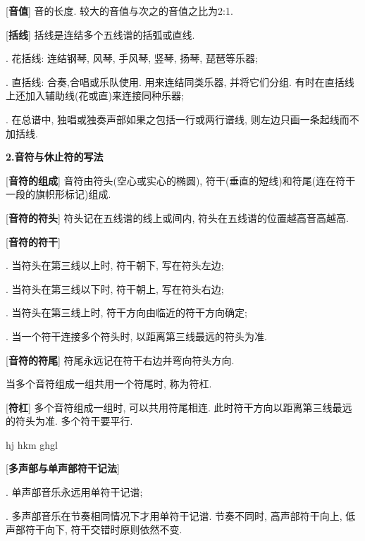 [\textbf{音值}] 音的长度. 较大的音值与次之的音值之比为2:1.\par

[\textbf{括线}] 括线是连结多个五线谱的括弧或直线.\par
{}
\startextract\zendextract
{}. 花括线: 连结钢琴, 风琴, 手风琴, 竖琴, 扬琴, 琵琶等乐器;\par
{}. 直括线: 合奏,合唱或乐队使用. 用来连结同类乐器, 并将它们分组. 有时在直括线上还加入辅助线(花或直)来连接同种乐器;\par
{}. 在总谱中, 独唱或独奏声部如果之包括一行或两行谱线, 则左边只画一条起线而不加括线.\par

\begin{center}
 \textbf{2.音符与休止符的写法}\\
\end{center}

[\textbf{音符的组成}] 音符由符头(空心或实心的椭圆), 符干(垂直的短线)和符尾(连在符干一段的旗帜形标记)组成.\par

[\textbf{音符的符头}] 符头记在五线谱的线上或间内, 符头在五线谱的位置越高音高越高.\par

[\textbf{音符的符干}] \par
{}. 当符头在第三线以上时, 符干朝下, 写在符头左边;\par
{}. 当符头在第三线以下时, 符干朝上, 写在符头右边;\par
{}. 当符头在第三线上时, 符干方向由临近的符干方向确定;\par
{}. 当一个符干连接多个符头时, 以距离第三线最远的符头为准.\par

[\textbf{音符的符尾}] 符尾永远记在符干右边并弯向符头方向.\par
\qquad 当多个音符组成一组共用一个符尾时, 称为符杠.\par

[\textbf{符杠}] 多个音符组成一组时, 可以共用符尾相连. 此时符干方向以距离第三线最远的符头为准. 多个符干要平行.\par
{}
\akkoladen{}
\startextract \Notes
{}            \Dqbl hj \Tqbl hkm \Qqbbl ghgl
\en\zendextract 

\clearpage

[\textbf{多声部与单声部符干记法}]\par
{}. 单声部音乐永远用单符干记谱;\par
{}. 多声部音乐在节奏相同情况下才用单符干记谱. 节奏不同时, 高声部符干向上, 低声部符干向下, 符干交错时原则依然不变.\par


